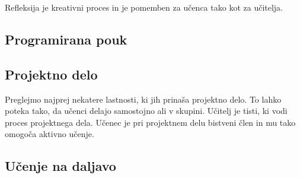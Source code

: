Refleksija je kreativni proces in je pomemben za učenca tako kot za
učitelja.

\subsection{Programirana pouk}
\label{programirani_pouk}




\subsection{Projektno delo}
\label{sec:projektno_delo}

Preglejmo najprej nekatere lastnosti, ki jih prinaša projektno
delo. To lahko poteka tako, da učenci delajo samostojno ali v
skupini. Učitelj je tisti, ki vodi proces projektnega dela. Učenec je
pri projektnem delu bistveni člen in mu tako omogoča aktivno učenje.


\subsection{Učenje  na daljavo}
\label{sec:Učenje_na_daljavo}


